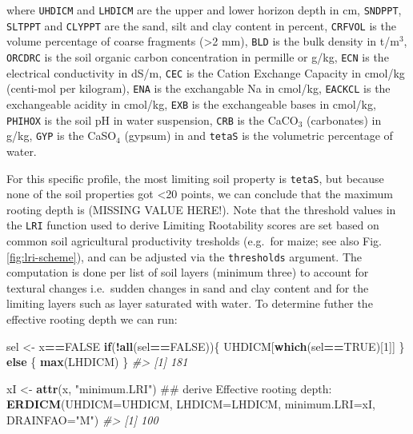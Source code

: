 \documentclass[11pt]{krantz}
\newenvironment{Shaded}{\begin{snugshade}}{\end{snugshade}}
\newcommand{\CommentTok}[1]{\textcolor[rgb]{0.37,0.37,0.37}{\textit{#1}}}
\newcommand{\ControlFlowTok}[1]{\textcolor[rgb]{0.27,0.27,0.27}{\textbf{#1}}}
\newcommand{\DataTypeTok}[1]{\textcolor[rgb]{0.27,0.27,0.27}{#1}}
\newcommand{\DecValTok}[1]{\textcolor[rgb]{0.06,0.06,0.06}{#1}}
\newcommand{\KeywordTok}[1]{\textcolor[rgb]{0.27,0.27,0.27}{\textbf{#1}}}
\newcommand{\NormalTok}[1]{#1}
\newcommand{\OperatorTok}[1]{\textcolor[rgb]{0.43,0.43,0.43}{\textbf{#1}}}
\newcommand{\OtherTok}[1]{\textcolor[rgb]{0.37,0.37,0.37}{#1}}
\newcommand{\StringTok}[1]{\textcolor[rgb]{0.5,0.5,0.5}{#1}}
\theoremstyle{definition}
\theoremstyle{definition}
\theoremstyle{definition}
\theoremstyle{remark}
\begin{document}
where \texttt{UHDICM} and \texttt{LHDICM} are the upper and lower
horizon depth in cm, \texttt{SNDPPT}, \texttt{SLTPPT} and
\texttt{CLYPPT} are the sand, silt and clay content in percent,
\texttt{CRFVOL} is the volume percentage of coarse fragments
(\textgreater{}2 mm), \texttt{BLD} is the bulk density in t/m\(^3\),
\texttt{ORCDRC} is the soil organic carbon concentration in permille or
g/kg, \texttt{ECN} is the electrical conductivity in dS/m, \texttt{CEC}
is the Cation Exchange Capacity in cmol/kg (centi-mol per kilogram),
\texttt{ENA} is the exchangable Na in cmol/kg, \texttt{EACKCL} is the
exchangeable acidity in cmol/kg, \texttt{EXB} is the exchangeable bases
in cmol/kg, \texttt{PHIHOX} is the soil pH in water suspension,
\texttt{CRB} is the CaCO\(_3\) (carbonates) in g/kg, \texttt{GYP} is the
CaSO\(_4\) (gypsum) in and \texttt{tetaS} is the volumetric percentage
of water.

For this specific profile, the most limiting soil property is
\texttt{tetaS}, but because none of the soil properties got
\textless{}20 points, we can conclude that the maximum rooting depth is
(MISSING VALUE HERE!). Note that the threshold values in the
\texttt{LRI} function used to derive Limiting Rootability scores are set
based on common soil agricultural productivity tresholds (e.g.~for
maize; see also Fig. \ref{fig:lri-scheme}), and can be adjusted via the
\texttt{thresholds} argument. The computation is done per list of soil
layers (minimum three) to account for textural changes i.e.~sudden
changes in sand and clay content and for the limiting layers such as
layer saturated with water. To determine futher the effective rooting
depth we can run:

\begin{Shaded}
\begin{Highlighting}[]
\NormalTok{sel <-}\StringTok{ }\NormalTok{x}\OperatorTok{==}\OtherTok{FALSE}
\ControlFlowTok{if}\NormalTok{(}\OperatorTok{!}\KeywordTok{all}\NormalTok{(sel}\OperatorTok{==}\OtherTok{FALSE}\NormalTok{))\{ }
\NormalTok{  UHDICM[}\KeywordTok{which}\NormalTok{(sel}\OperatorTok{==}\OtherTok{TRUE}\NormalTok{)[}\DecValTok{1}\NormalTok{]] }
\NormalTok{\} }\ControlFlowTok{else}\NormalTok{ \{}
  \KeywordTok{max}\NormalTok{(LHDICM)}
\NormalTok{\}}
\CommentTok{#> [1] 181}

\NormalTok{xI <-}\StringTok{ }\KeywordTok{attr}\NormalTok{(x, }\StringTok{"minimum.LRI"}\NormalTok{)}
\NormalTok{## derive Effective rooting depth:}
\KeywordTok{ERDICM}\NormalTok{(}\DataTypeTok{UHDICM=}\NormalTok{UHDICM, }\DataTypeTok{LHDICM=}\NormalTok{LHDICM, }\DataTypeTok{minimum.LRI=}\NormalTok{xI, }\DataTypeTok{DRAINFAO=}\StringTok{"M"}\NormalTok{)}
\CommentTok{#> [1] 100}
\end{Highlighting}
\end{Shaded}
\end{document}
